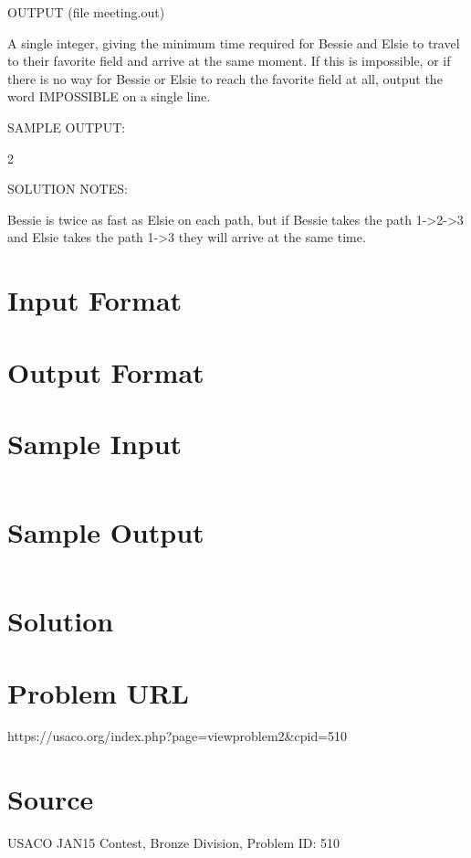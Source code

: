 \documentclass[12pt]{article}
\begin{document}
OUTPUT (file meeting.out)

A single integer, giving the minimum time required for Bessie and
Elsie to travel to their favorite field and arrive at the same moment.
If this is impossible, or if there is no way for Bessie or Elsie to reach
the favorite field at all, output the word IMPOSSIBLE on a single line.

SAMPLE OUTPUT:

2

SOLUTION NOTES:

Bessie is twice as fast as Elsie on each path, but if Bessie takes the
path 1->2->3 and Elsie takes the path 1->3 they will arrive at the
same time.




\section*{Input Format}


\section*{Output Format}


\section*{Sample Input}
\begin{verbatim}

\end{verbatim}

\section*{Sample Output}
\begin{verbatim}

\end{verbatim}

\section*{Solution}


\section*{Problem URL}
https://usaco.org/index.php?page=viewproblem2&cpid=510

\section*{Source}
USACO JAN15 Contest, Bronze Division, Problem ID: 510
\end{document}
